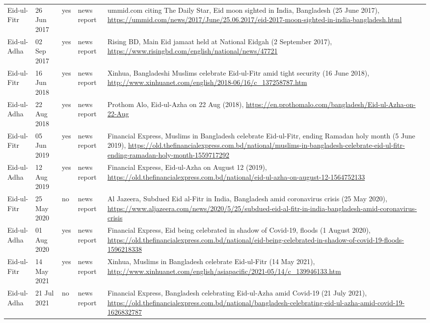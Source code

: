 \begin{longtable}{L{2.0cm} L{1.8cm} C{0.8cm} L{1.8cm} L{8.6cm}}
Eid-ul-Fitr & 26 Jun 2017 & yes & news report & ummid.com citing The Daily Star, Eid moon sighted in India, Bangladesh (25 June 2017), \url{https://ummid.com/news/2017/June/25.06.2017/eid-2017-moon-sighted-in-india-bangladesh.html} \\
Eid-ul-Adha & 02 Sep 2017 & yes & news report & Rising BD, Main Eid jamaat held at National Eidgah (2 September 2017), \url{https://www.risingbd.com/english/national/news/47721} \\
Eid-ul-Fitr & 16 Jun 2018 & yes & news report & Xinhua, Bangladeshi Muslims celebrate Eid-ul-Fitr amid tight security (16 June 2018), \url{http://www.xinhuanet.com/english/2018-06/16/c_137258787.htm} \\
Eid-ul-Adha & 22 Aug 2018 & yes & news report & Prothom Alo, Eid-ul-Azha on 22 Aug (2018), \url{https://en.prothomalo.com/bangladesh/Eid-ul-Azha-on-22-Aug} \\
Eid-ul-Fitr & 05 Jun 2019 & yes & news report & Financial Express, Muslims in Bangladesh celebrate Eid-ul-Fitr, ending Ramadan holy month (5 June 2019), \url{https://old.thefinancialexpress.com.bd/national/muslims-in-bangladesh-celebrate-eid-ul-fitr-ending-ramadan-holy-month-1559717292} \\
Eid-ul-Adha & 12 Aug 2019 & yes & news report & Financial Express, Eid-ul-Azha on August 12 (2019), \url{https://old.thefinancialexpress.com.bd/national/eid-ul-azha-on-august-12-1564752133} \\
Eid-ul-Fitr & 25 May 2020 & no & news report & Al Jazeera, Subdued Eid al-Fitr in India, Bangladesh amid coronavirus crisis (25 May 2020), \url{https://www.aljazeera.com/news/2020/5/25/subdued-eid-al-fitr-in-india-bangladesh-amid-coronavirus-crisis} \\
Eid-ul-Adha & 01 Aug 2020 & yes & news report & Financial Express, Eid being celebrated in shadow of Covid-19, floods (1 August 2020), \url{https://old.thefinancialexpress.com.bd/national/eid-being-celebrated-in-shadow-of-covid-19-floods-1596218338} \\
Eid-ul-Fitr & 14 May 2021 & yes & news report & Xinhua, Muslims in Bangladesh celebrate Eid-ul-Fitr (14 May 2021), \url{http://www.xinhuanet.com/english/asiapacific/2021-05/14/c_139946133.htm} \\
Eid-ul-Adha & 21 Jul 2021 & no & news report & Financial Express, Bangladesh celebrating Eid-ul-Azha amid Covid-19 (21 July 2021), \url{https://old.thefinancialexpress.com.bd/national/bangladesh-celebrating-eid-ul-azha-amid-covid-19-1626832787} \\

\end{longtable}
